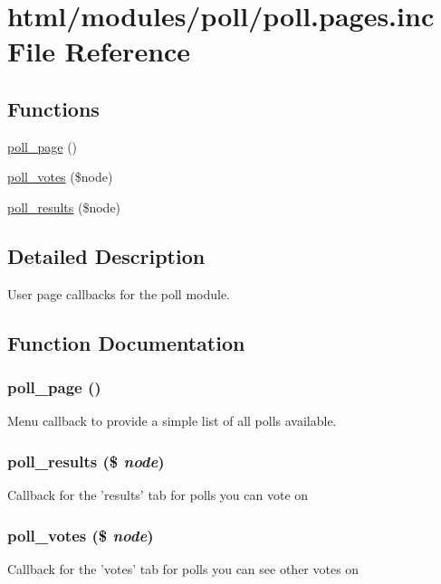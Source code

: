 \hypertarget{poll_8pages_8inc}{
\section{html/modules/poll/poll.pages.inc File Reference}
\label{poll_8pages_8inc}
}
\subsection*{Functions}
\begin{DoxyCompactItemize}
\item 
\hyperlink{poll_8pages_8inc_aa3710efcad2e049b1358cab8fc689270}{poll\_\-page} ()
\item 
\hyperlink{poll_8pages_8inc_aba05cafb193346dcc10f8add20b7a372}{poll\_\-votes} (\$node)
\item 
\hyperlink{poll_8pages_8inc_ad54476ab27ee3bb22df58380aa53105d}{poll\_\-results} (\$node)
\end{DoxyCompactItemize}


\subsection{Detailed Description}
User page callbacks for the poll module. 

\subsection{Function Documentation}
\hypertarget{poll_8pages_8inc_aa3710efcad2e049b1358cab8fc689270}{
\subsubsection[{poll\_\-page}]{\setlength{\rightskip}{0pt plus 5cm}poll\_\-page ()}}
\label{poll_8pages_8inc_aa3710efcad2e049b1358cab8fc689270}
Menu callback to provide a simple list of all polls available. \hypertarget{poll_8pages_8inc_ad54476ab27ee3bb22df58380aa53105d}{
\subsubsection[{poll\_\-results}]{\setlength{\rightskip}{0pt plus 5cm}poll\_\-results (\$ {\em node})}}
\label{poll_8pages_8inc_ad54476ab27ee3bb22df58380aa53105d}
Callback for the 'results' tab for polls you can vote on \hypertarget{poll_8pages_8inc_aba05cafb193346dcc10f8add20b7a372}{
\subsubsection[{poll\_\-votes}]{\setlength{\rightskip}{0pt plus 5cm}poll\_\-votes (\$ {\em node})}}
\label{poll_8pages_8inc_aba05cafb193346dcc10f8add20b7a372}
Callback for the 'votes' tab for polls you can see other votes on 